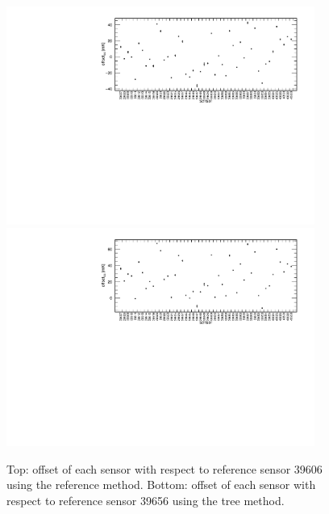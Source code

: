 \begin{figure}[htbp]
\centering
{\includegraphics[width=0.9\textwidth]{images/figure_12_a.pdf}}
{\includegraphics[width=0.9\textwidth]{images/figure_12_b.pdf}}
\caption{Top: offset of each sensor with respect to reference sensor 39606 using the reference method. Bottom: offset of each sensor with respect to reference sensor 39656 using the tree method.}
\label{fig:offsets_tree_1}
\end{figure}

